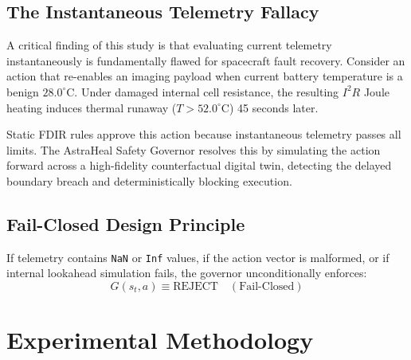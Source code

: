 \documentclass[conference]{IEEEtran}
\begin{document}
\subsection{The Instantaneous Telemetry Fallacy}
A critical finding of this study is that evaluating current telemetry instantaneously is fundamentally flawed for spacecraft fault recovery. Consider an action that re-enables an imaging payload when current battery temperature is a benign $28.0^\circ\text{C}$. Under damaged internal cell resistance, the resulting $I^2 R$ Joule heating induces thermal runaway ($T > 52.0^\circ\text{C}$) 45 seconds later. 

Static FDIR rules approve this action because instantaneous telemetry passes all limits. The AstraHeal Safety Governor resolves this by simulating the action forward across a high-fidelity counterfactual digital twin, detecting the delayed boundary breach and deterministically blocking execution.

\subsection{Fail-Closed Design Principle}
If telemetry contains \texttt{NaN} or \texttt{Inf} values, if the action vector is malformed, or if internal lookahead simulation fails, the governor unconditionally enforces:
\begin{equation}
G(s_t, a) \equiv \text{REJECT} \quad (\text{Fail-Closed})
\end{equation}

\section{Experimental Methodology}
\end{document}
